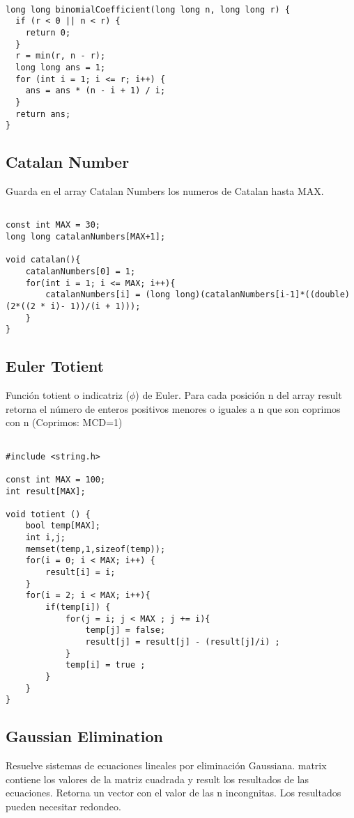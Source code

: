 \documentclass[11pt,letterpaper,twocolumn,twosided]{article}
\begin{document}
\begin{lstlisting}

long long binomialCoefficient(long long n, long long r) {
  if (r < 0 || n < r) { 
  	return 0; 
  }
  r = min(r, n - r);
  long long ans = 1;
  for (int i = 1; i <= r; i++) {
    ans = ans * (n - i + 1) / i;
  }
  return ans;
}
\end{lstlisting}

\subsection{Catalan Number}
Guarda en el array Catalan Numbers los numeros de Catalan hasta MAX.

\begin{lstlisting}

const int MAX = 30;
long long catalanNumbers[MAX+1];

void catalan(){
	catalanNumbers[0] = 1;
	for(int i = 1; i <= MAX; i++){
		catalanNumbers[i] = (long long)(catalanNumbers[i-1]*((double)(2*((2 * i)- 1))/(i + 1)));
	}
}
\end{lstlisting}

\subsection{Euler Totient}
Funci\'on totient o indicatriz ($\phi$) de Euler. Para cada posici\'on n del array result retorna el n\'umero de enteros positivos menores o iguales a n que son coprimos con n (Coprimos: MCD=1)

\begin{lstlisting}

#include <string.h>

const int MAX = 100;
int result[MAX]; 

void totient () {
	bool temp[MAX];
	int i,j;
	memset(temp,1,sizeof(temp));
	for(i = 0; i < MAX; i++) {
		result[i] = i;
	}
	for(i = 2; i < MAX; i++){
		if(temp[i]) {
			for(j = i; j < MAX ; j += i){
				temp[j] = false;
				result[j] = result[j] - (result[j]/i) ;
			}
			temp[i] = true ;
		}
	}
}
\end{lstlisting}

\subsection{Gaussian Elimination}
Resuelve sistemas de ecuaciones lineales por eliminaci\'on Gaussiana.  matrix contiene los valores de la matriz cuadrada y result los resultados de las ecuaciones. Retorna un vector con el valor de las n incongnitas. Los resultados pueden necesitar redondeo.
\end{document}
